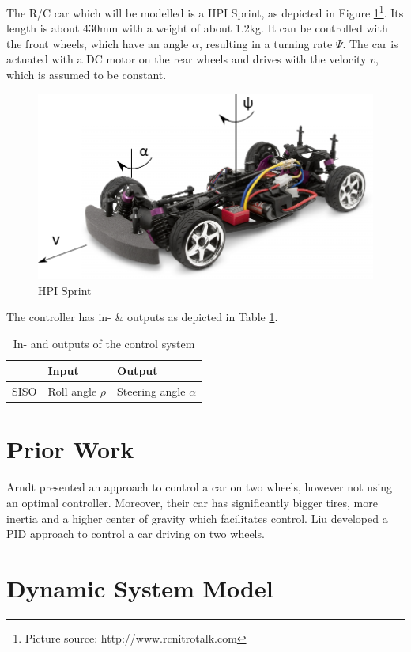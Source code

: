 \documentclass[conference]{IEEEtran}
\begin{document}
The R/C car which will be modelled is a HPI Sprint, as depicted in Figure \ref{figure:hpi_sprint}\footnote{Picture source: http://www.rcnitrotalk.com}. Its length is about 430mm with a weight of about 1.2kg. It can be controlled with the front wheels, which have an angle $\alpha$, resulting in a turning rate $\Psi$. The car is actuated with a DC motor on the rear wheels and drives with the velocity $v$, which is assumed to be constant.  

\begin{figure}[h!]
\centering
  \includegraphics[width=.3\textwidth]{pics/hpisprintgeom.pdf} 
  \caption{HPI Sprint}  
  \label{figure:hpi_sprint}
\end{figure}

The controller has in- \& outputs as depicted in Table \ref{figure:controlinout}. 

\begin{table}[h]
\begin{center}
\begin{tabular}{|l||l|l|}
\hline
 		& Input 		& Output\\
\hline
SISO 	& Roll angle $\rho$ 	& Steering angle $\alpha$\\
\hline
\end{tabular}
\caption{In- and outputs of the control system}  
\label{figure:controlinout}
\end{center}
\end{table}


\section{Prior Work}

Arndt \cite{bib:arndt} presented an approach to control a car on two wheels, however not using an optimal controller. Moreover, their car has significantly bigger tires, more inertia and a higher center of gravity which facilitates control. Liu \cite{bib:liu} developed a PID approach to control a car driving on two wheels.

\section{Dynamic System Model}
\end{document}
